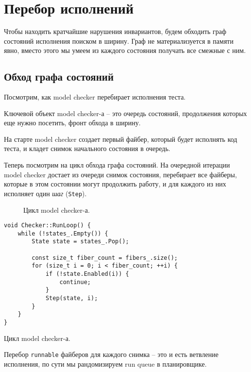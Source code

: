 \section{Перебор исполнений}

Чтобы находить кратчайшие нарушения инвариантов, будем обходить граф состояний исполнения поиском в ширину. Граф не материализуется в памяти явно, вместо этого мы умеем из каждого состояния получать все смежные с ним.

\subsection{Обход графа состояний}

Посмотрим, как model checker перебирает исполнения теста.

Ключевой объект model checker-а – это очередь состояний, продолжения которых еще нужно посетить, фронт обхода в ширину. 

На старте model checker создает первый файбер, который будет исполнять код теста, и кладет снимок начального состояния в очередь.

Теперь посмотрим на цикл обхода графа состояний. На очередной итерации model checker достает из очереди снимок состояния, перебирает все файберы, которые в этом состоянии могут продолжить работу, и для каждого из них исполняет один \emph{шаг} (\texttt{Step}). 


\begin{figure}
	\bigskip
	\caption{Цикл model checker-а.}\label{fig:runloop}
\end{figure}

\else

\begin{listing}
	\centering
	
	\begin{verbatim}
void Checker::RunLoop() {
	while (!states_.Empty()) {
		State state = states_.Pop();

		const size_t fiber_count = fibers_.size();
		for (size_t i = 0; i < fiber_count; ++i) {
			if (!state.Enabled(i)) {
				continue;
			}
			Step(state, i);
		}
	}
}
	\end{verbatim}
	\caption{Цикл model checker-а.}
	\label{loop}
\end{listing}

\fi

Перебор \texttt{runnable} файберов для каждого снимка – это и есть ветвление исполнения, по сути мы рандомизируем run queue в планировщике.

